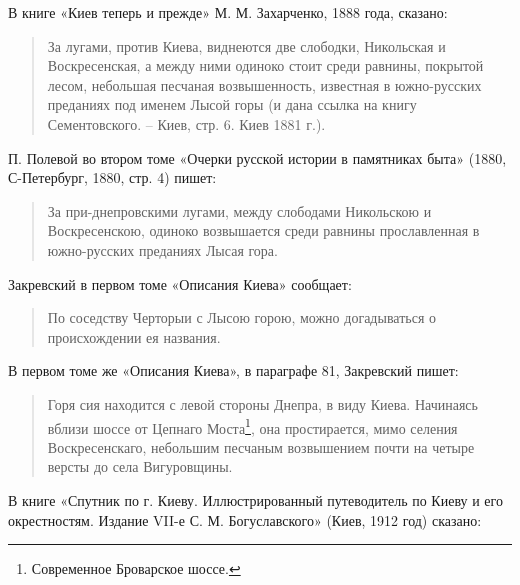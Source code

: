 В книге «Киев теперь и прежде» М. М. Захарченко, 1888 года, сказано:

\begin{quotation}
За лугами, против Киева, виднеются две слободки, Никольская и Воскресенская, а между ними одиноко стоит среди равнины, покрытой лесом, небольшая песчаная возвышенность, известная в южно-русских преданиях под именем Лысой горы (и дана ссылка на книгу Сементовского. – Киев, стр. 6. Киев 1881 г.).
\end{quotation}

П. Полевой во втором томе «Очерки русской истории в памятниках быта» (1880, С-Петербург, 1880, стр. 4) пишет:

\begin{quotation}
За при-днепровскими лугами, между слободами Никольскою и Воскресенскою, одиноко возвышается среди равнины прославленная в южно-русских преданиях Лысая гора.
\end{quotation}

Закревский в первом томе «Описания Киева» сообщает:

\begin{quotation}
По соседству Черторыи с Лысою горою, можно догадываться о происхождении ея названия.
\end{quotation}

В первом томе же «Описания Киева», в параграфе 81, Закревский пишет:

\begin{quotation}
Горя сия находится с левой стороны Днепра, в виду Киева. Начинаясь вблизи шоссе от Цепнаго Моста\footnote{Современное Броварское шоссе.}, она простирается, мимо селения Воскресенскаго, небольшим песчаным возвышением почти на четыре версты до села Вигуровщины.
\end{quotation}

В книге «Спутник по г. Киеву. Иллюстрированный путеводитель по Киеву и его окрестностям. Издание VII-е С. М. Богуславского» (Киев, 1912 год) сказано:

